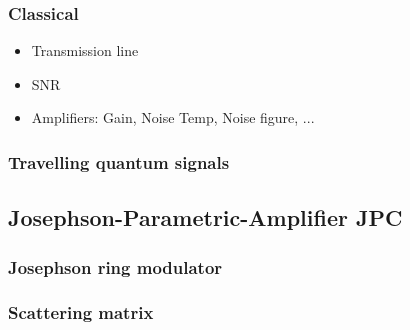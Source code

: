 
\subsubsection{Classical}

\begin{itemize}
\item Transmission line 
\item SNR 
\item Amplifiers: Gain, Noise Temp, Noise figure, ...
\end{itemize}  

\subsubsection{Travelling quantum signals}

\subsection{Josephson-Parametric-Amplifier JPC}
\label{subsec:introduction:jpc}

\subsubsection{Josephson ring modulator}
\subsubsection{Scattering matrix}


